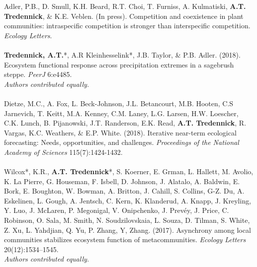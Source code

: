 

\begin{pubentries}
\begin{\small}
Adler, P.B., D. Smull, K.H. Beard, R.T. Choi, T. Furniss, A. Kulmatiski, {\bf{A.T. Tredennick}}, \& K.E. Veblen. (In press). Competition and coexistence in plant communities: intraspecific competition is stronger than interspecific competition. \emph{Ecology Letters}.\\
\\
{\bf{Tredennick, A.T.}}*, A.R Kleinhesselink*, J.B. Taylor, \& P.B. Adler. (2018). Ecosystem functional response across precipitation extremes in a sagebrush steppe. \emph{PeerJ} 6:e4485.\\
{\footnotesize*{\emph{Authors contributed equally.}}}\\
\\
Dietze, M.C., A. Fox, L. Beck-Johnson, J.L. Betancourt, M.B. Hooten, C.S Jarnevich, T. Keitt, M.A. Kenney, C.M. Laney, L.G. Larsen, H.W. Loescher, C.K. Lunch, B. Pijanowski, J.T. Randerson, E.K. Read, {\bf{A.T. Tredennick}}, R. Vargas, K.C. Weathers, \& E.P. White. (2018). Iterative near-term ecological forecasting: Needs, opportunities, and challenges. \emph{Proceedings of the National Academy of Sciences} 115(7):1424-1432.\\
\\
Wilcox*, K.R., {\bf{A.T. Tredennick}}*, S. Koerner, E. Grman, L. Hallett, M. Avolio, K. La Pierre, G. Houseman, F. Isbell, D. Johnson, J. Alatalo, A. Baldwin, E. Bork, E. Boughton, W. Bowman, A. Britton, J. Cahill, S. Collins, G-Z. Du, A. Eskelinen, L. Gough, A. Jentsch, C. Kern, K. Klanderud, A. Knapp, J. Kreyling, Y. Luo, J. McLaren, P. Megonigal, V. Onipchenko, J. Prevéy, J. Price, C. Robinson, O. Sala, M. Smith, N. Soudzilovskaia, L. Souza, D. Tilman, S. White, Z. Xu, L. Yahdjian, Q. Yu, P. Zhang, Y, Zhang. (2017). Asynchrony among local communities stabilizes ecosystem function of metacommunities. \emph{Ecology Letters} 20(12):1534–1545.\\
{\footnotesize*{\emph{Authors contributed equally.}}}\\
\\

\end{\small}
\end{pubentries}

